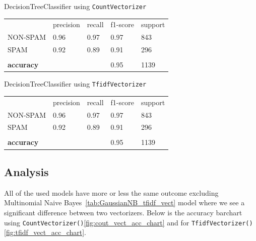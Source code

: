 DecisionTreeClassifier using \verb|CountVectorizer|
\begin{table}[H]
    \begin{tabular}{lllll}
        & precision & recall & f1-score                     & support \\
        NON-SPAM          & 0.96      & 0.97   & 0.97                         & 843     \\
        SPAM              & 0.92      & 0.89   & 0.91                         & 296     \\
        &           &        &                              &         \\
        \textbf{accuracy} &           &        & \cellcolor[HTML]{FFCCC9}0.95 & 1139
    \end{tabular}\label{tab:DecisionTreeClassifier_count_vect}
\end{table}

DecisionTreeClassifier using \verb|TfidfVectorizer|
\begin{table}[H]
    \begin{tabular}{lllll}
        & precision & recall & f1-score                     & support \\
        NON-SPAM          & 0.96      & 0.97   & 0.97                         & 843     \\
        SPAM              & 0.92      & 0.89   & 0.91                         & 296     \\
        &           &        &                              &         \\
        \textbf{accuracy} &           &        & \cellcolor[HTML]{FFCCC9}0.95 & 1139
    \end{tabular}\label{tab:DecisionTreeClassifier_tfidf_vect}
\end{table}

\subsection{Analysis}\label{subsec:analysis}
All of the used models have more or less the same outcome excluding Multinomial Naive Bayes~\ref{tab:GaussianNB_tfidf_vect} model
where we see a significant difference between two vectorizers.
Below is the accuracy barchart using \verb|CountVectorizer()|\ref{fig:cout_vect_acc_chart} and for \verb|TfidfVectorizer()|\ref{fig:tfidf_vect_acc_chart}.

